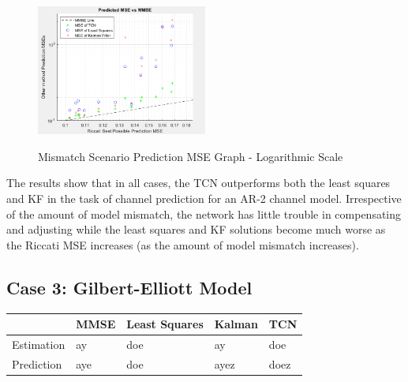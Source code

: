 \documentclass[twocolumn,letterpaper]{IEEEAerospaceCLS}  %
\begin{document}
\begin{figure}[!h]
	\centering\includegraphics[width=0.5\textwidth]{figs/mismatch_LOG.PNG}\\
	\caption{Mismatch Scenario Prediction MSE Graph - Logarithmic Scale}
	\label{c2resultsall}
\end{figure}

The results show that in all cases, the TCN outperforms both the least squares and KF in the task of channel prediction for an AR-2 channel model. Irrespective of the amount of model mismatch, the network has little trouble in compensating and adjusting while the least squares and KF solutions become much worse as the Riccati MSE increases (as the amount of model mismatch increases).  

\subsection{Case 3: Gilbert-Elliott Model}

\begin{table}[!h]
\begin{tabular}{|l|l|l|l|l|}
\hline
                            & MMSE                 & Least Squares        & Kalman         & TCN                   \\ \hline
\multirow{3}{*}{Estimation} & \multirow{3}{*}{ay}  & \multirow{3}{*}{doe} & \multirow{3}{*}{ay}   & \multirow{3}{*}{doe}  \\
                            &                      &                      &                       &                       \\
                            &                      &                      &                       &                       \\ \hline
\multirow{3}{*}{Prediction} & \multirow{3}{*}{aye} & \multirow{3}{*}{doe} & \multirow{3}{*}{ayez} & \multirow{3}{*}{doez} \\
                            &                      &                      &                       &                       \\
                            &                      &                      &                       &                       \\ \hline
\end{tabular}
\end{table}
\end{document}
